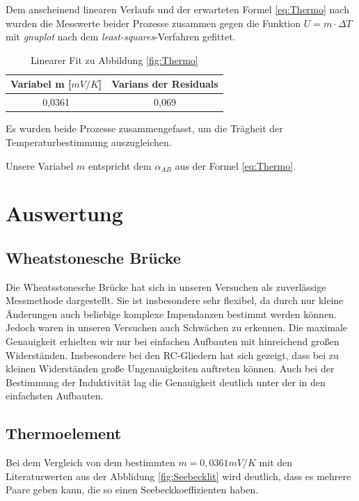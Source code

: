 Dem anscheinend linearen Verlaufs und der erwarteten Formel \ref{eq:Thermo} nach wurden die Messwerte beider Prozesse zusammen gegen die Funktion $U=m\cdot\Delta T$ mit \emph{gnuplot} nach dem \emph{least-squares}-Verfahren gefittet.
\begin{table}[H]
  \centering
  \begin{tabular}{c | c}
    Variabel m [$mV/K$] & Varians der Residuals\\ \hline
    0,0361  & 0,069
  \end{tabular}
  \caption{Linearer Fit zu Abbildung \ref{fig:Thermo}}
  \label{tab:fitThermo}
\end{table}
Es wurden beide Prozesse zusammengefasst, um die Trägheit der Temperaturbestimmung auszugleichen.

Unsere Variabel $m$ entspricht dem $\alpha_{AB}$ aus der Formel \ref{eq:Thermo}. 
\section{Auswertung}
\subsection{Wheatstonesche Brücke}
Die Wheatsstonesche Brücke hat sich in unseren Versuchen als zuverlässige Messmethode dargestellt. Sie ist insbesondere sehr flexibel, da durch nur kleine Änderungen auch beliebige komplexe Impendanzen bestimmt werden können. Jedoch waren in unseren Versuchen auch Schwächen zu erkennen. Die maximale Genauigkeit erhielten wir nur bei einfachen Aufbauten mit hinreichend großen Widerständen. Insbesondere bei den RC-Gliedern hat sich gezeigt, dass bei zu kleinen Widerständen große Ungenauigkeiten auftreten können. Auch bei der Bestimmung der Induktivität lag die Genauigkeit deutlich unter der in den einfachsten Aufbauten. 

\subsection{Thermoelement}
Bei dem Vergleich von dem bestimmten $m=0,0361 mV/K$ mit den Literaturwerten aus der Abblidung \ref{fig:Seebecklit} wird deutlich, dass es mehrere Paare geben kann, die so einen Seebeckkoeffizienten haben.

